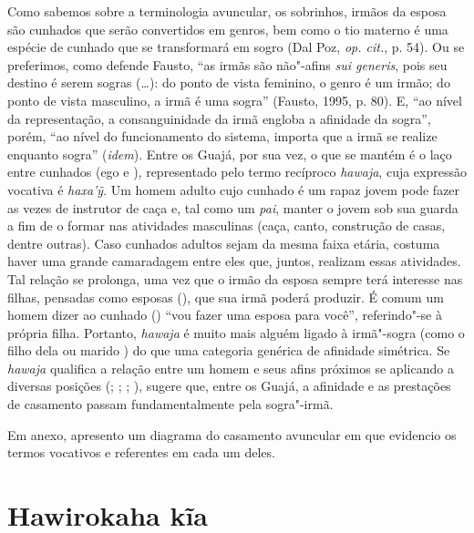 Como sabemos sobre a terminologia avuncular, os sobrinhos, irmãos da
esposa são cunhados que serão convertidos em genros, bem como o tio
materno é uma espécie de cunhado que se transformará em sogro (Dal Poz,
\emph{op. cit.}, p. 54). Ou se preferimos, como defende Fausto, ``as irmãs são
não"-afins \emph{sui generis}, pois seu destino é serem sogras (\ldots{}): do
ponto de vista feminino, o genro é um irmão; do ponto de vista
masculino, a irmã é uma sogra'' (Fausto, 1995, p. 80). E, ``ao nível da
representação, a consanguinidade da irmã engloba a afinidade da sogra'',
porém, ``ao nível do funcionamento do sistema, importa que a irmã se
realize enquanto sogra'' (\emph{idem}). Entre os Guajá, por sua vez, o que se
mantém é o laço entre cunhados (ego e ), representado pelo termo
recíproco \emph{hawaja}, cuja expressão vocativa é \emph{haxa'ỹ}. Um
homem adulto cujo cunhado é um rapaz jovem pode fazer as vezes de
instrutor de caça e, tal como um \emph{pai}, manter o jovem sob sua
guarda a fim de o formar nas atividades masculinas (caça, canto,
construção de casas, dentre outras). Caso cunhados adultos sejam da
mesma faixa etária, costuma haver uma grande camaradagem entre eles que,
juntos, realizam essas atividades. Tal relação se prolonga, uma vez que
o irmão da esposa sempre terá interesse nas filhas, pensadas como
esposas (), que sua irmã poderá produzir. É comum um homem dizer ao
cunhado () ``vou fazer uma esposa para você'', referindo"-se à própria
filha. Portanto, \emph{hawaja} é muito mais alguém ligado à irmã"-sogra
(como o filho dela  ou marido ) do que uma categoria genérica de
afinidade simétrica. Se \emph{hawaja} qualifica a relação entre um homem
e seus afins próximos se aplicando a diversas posições (; ; ; ),
sugere que, entre os Guajá, a afinidade e as prestações de casamento
passam fundamentalmente pela sogra"-irmã.

Em anexo, apresento um diagrama do casamento avuncular em que evidencio
os termos vocativos e referentes em cada um deles.

\section{Hawirokaha kĩa}

